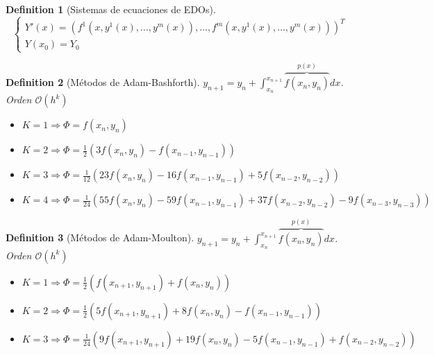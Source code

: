 \documentclass[leqno]{article}
\newtheorem*{definition}{Definition}
\begin{document}
\begin{definition}[Sistemas de ecuaciones de EDOs]
\[
  \begin{cases}
  Y'(x)=(f^1(x, y^1(x), \ldots , y^m(x)), \ldots , f^m(x, y^1(x), \ldots , y^m(x)) )^T\\
  Y(x_0) = Y_0
\end{cases}
\] 
\end{definition}

\begin{definition}[Métodos de Adam-Bashforth] $y_{n+1} = y_n + \int_{x_n}^{x_{n+1}} \overbrace{f(x_n, y_n)}^{p(x)}dx$. Orden $\mathcal{O}(h^k)$
  \begin{itemize}[topsep=-6pt, itemsep=0pt]
    \item $K=1 \Rightarrow \Phi  = f(x_n, y_n)$
    \item $K=2 \Rightarrow \Phi  = \frac{1}{2}(3f(x_n, y_n) - f(x_{n-1}, y_{n-1}))$
    \item $K=3 \Rightarrow \Phi  = \frac{1}{12}(23f(x_n, y_n) - 16f(x_{n-1}, y_{n-1}) + 5f(x_{n-2}, y_{n-2}))$
    \item $K=4 \Rightarrow \Phi  = \frac{1}{24}(55f(x_n, y_n) - 59f(x_{n-1}, y_{n-1}) + 37f(x_{n-2}, y_{n-2}) - 9f(x_{n-3}, y_{n-3}))$
  \end{itemize}
\end{definition}

\begin{definition}[Métodos de Adam-Moulton] $y_{n+1} = y_n + \int_{x_n}^{x_{n+1}} \overbrace{f(x_n, y_n)}^{p(x)}dx$. Orden $\mathcal{O}(h^k)$
  \begin{itemize}[topsep=-6pt, itemsep=0pt]
    \item $K=1 \Rightarrow \Phi  = \frac{1}{2}(f(x_{n+1}, y_{n+1}) + f(x_{n}, y_{n}))$
    \item $K=2 \Rightarrow \Phi  = \frac{1}{2}(5f(x_{n+1}, y_{n+1}) + 8f(x_{n}, y_{n}) - f(x_{n-1}, y_{n-1}))$
    \item $K=3 \Rightarrow \Phi  = \frac{1}{24}(9f(x_{n+1}, y_{n+1}) + 19f(x_{n}, y_{n}) - 5f(x_{n-1}, y_{n-1}) + f(x_{n-2}, y_{n-2}))$
  \end{itemize}
\end{definition}
\end{document}

